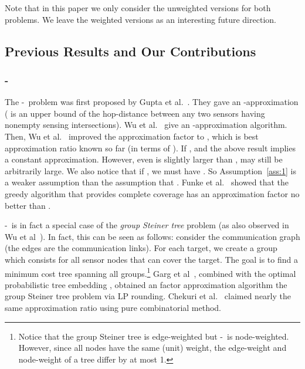 \documentclass[11pt]{article}
\newcommand{\rednote}[1]{#1}
\newcommand{\mincsc}{-}
\begin{document}
\rednote{Note that in this paper we only consider the unweighted versions for both problems. 
	We leave the weighted versions as an interesting future direction.}

\vspace{-0.3cm}
\subsection{Previous Results and Our Contributions}


\subsubsection{\mincsc}
The \mincsc\ problem was first proposed by Gupta et al.~\cite{gupta2006connected}.
They gave an -approximation
( is an upper bound of the hop-distance between any two sensors
having nonempty sensing intersections).
Wu et al.~\cite{wu2013approximations} give an -approximation algorithm.
\rednote{Then, Wu et al.~\cite{wu2016connected} improved the approximation factor to , which is best approximation ratio known so far (in terms of ).}
If ,  and the above result implies a constant approximation.
However, even
 is slightly larger than ,  may still be  arbitrarily large.
We also notice that if , we must have .
So Assumption~\ref{ass:1} is a weaker assumption than the assumption that .
\rednote{Funke et al.~\cite{funke2007improved} showed that the greedy algorithm that provides complete coverage has an approximation factor no better than .}

\mincsc\ is in fact a special case of the {\em group Steiner tree} problem
(as also observed in Wu et al~\cite{wu2013approximations,wu2016minimum}).
In fact, this can be seen as follows:
consider the communication graph (the edges are the communication links).
For each target, we create a group which consists for all sensor nodes that can cover the
target. The goal is to find a minimum cost tree spanning all groups.\footnote{
	Notice that the group Steiner tree is edge-weighted but \mincsc\ is node-weighted.
	However, since all nodes have the same (unit) weight, the edge-weight and node-weight of a tree differ by at most 1.
}
Garg et al~\cite{garg1998polylogarithmic}, combined with the optimal
probabilistic tree embedding \cite{fakcharoenphol2003tight}, \rednote{obtained} an  factor approximation algorithm the group Steiner tree problem via LP rounding.  Chekuri et al.~\cite{chekuri2006greedy} \rednote{claimed} nearly the same approximation ratio using pure combinatorial method.
\end{document}
